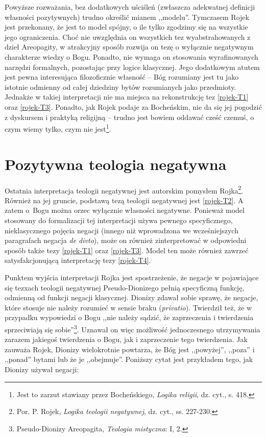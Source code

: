 Powyższe rozważania, bez dodatkowych uściśleń (zwłaszcza adekwatnej definicji własności pozytywnych)
trudno określić mianem ,,modelu''. Tymczasem Rojek jest przekonany, że jest to model spójny, o ile tylko zgodzimy się na
wszystkie jego ograniczenia. Choć nie
uwzględnia on wszystkich tez wyabstrahowanych z dzieł Areopagity, w
atrakcyjny sposób rozwija on tezę o wyłącznie negatywnym charakterze
wiedzy o Bogu. Ponadto, nie wymaga on stosowania wyrafinowanych
narzędzi formalnych, pozostając przy logice klasycznej. Jego dodatkowym
atutem jest pewna interesująca filozoficznie własność -- Bóg rozumiany
jest tu jako istotnie odmienny od całej dziedziny bytów rozumianych
jako przedmioty. Jednakże w takiej interpretacji nie ma miejsca na
rekonstrukcję tez \eqref{rojek-T1} oraz \eqref{rojek-T3}. Ponadto, jak Rojek podaje za Bocheńskim, nie da się jej pogodzić z
dyskursem i praktyką religijną -- trudno jest bowiem oddawać cześć
czemuś, o czym wiemy tylko, czym nie jest\footnote{Jest to zarzut
stawiany przez Bocheńskiego, \textit{Logika religii}, dz. cyt., s. 418.}.



\section{Pozytywna teologia negatywna}

Ostatnia interpretacja teologii negatywnej jest autorskim pomysłem
Rojka\footnote{Por. P. Rojek, \textit{Logika teologii negatywnej}, dz. cyt., ss. 227-230. }. Również na
jej gruncie, podstawą tezą teologii negatywnej jest \eqref{rojek-T2}. A zatem
o~Bogu można orzec wyłącznie własności negatywne. Ponieważ model
stosowany do formalizacji tej interpretacji używa pewnego
specyficznego, nieklasycznego pojęcia negacji (innego niż wprowadzona
we wcześniejszych paragrafach negacja \textit{de divto}), może on
również zinterpretować w odpowiedni sposób także tezy \eqref{rojek-T1} oraz \eqref{rojek-T3}.
Model ten może również zawrzeć satysfakcjonującą interpretację tezy
\eqref{rojek-T4}.

Punktem wyjścia interpretacji Rojka jest spostrzeżenie, że negacje w
pojawiające się tezxach teologii negatywnej Pseudo-Dionizego pełnią
specyficzną funkcję, odmienną od funkcji negacji klasycznej. Dionizy
zdawał sobie sprawę, że negacje, które stosuje nie należy rozumieć w
sensie braku (\textit{privatio}). Twierdził też, że w przypadku
wypowiedzi o Bogu ,,nie należy sądzić, że zaprzeczenia i twierdzenia
sprzeciwiają się sobie''\footnote{Pseudo-Dionizy Areopagita, \textit{Teologia mistyczna}:
I, 2. }. Uznawał on więc możliwość jednoczesnego utrzymywania
zarazem jakiegoś twierdzenia o Bogu, jak i zaprzeczenie tego twierdzenia. Jak
zauważa Rojek, Dionizy wielokrotnie powtarza, że Bóg jest ,,powyżej'',
,,poza'' i ,,ponad'' bytami lub że je ,,obejmuje''. Poniższy cytat jest
przykładem tego, jak Dionizy używał negacji:



